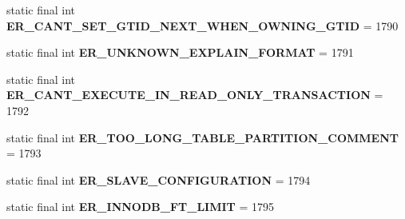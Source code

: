 \begin{DoxyCompactItemize}
\item 
\mbox{\label{classcom_1_1mysql_1_1cj_1_1exceptions_1_1_mysql_error_numbers_a1f4382313a77aeb1f93c33a0263d82d9}} 
static final int {\bfseries E\+R\+\_\+\+C\+A\+N\+T\+\_\+\+S\+E\+T\+\_\+\+G\+T\+I\+D\+\_\+\+N\+E\+X\+T\+\_\+\+W\+H\+E\+N\+\_\+\+O\+W\+N\+I\+N\+G\+\_\+\+G\+T\+ID} = 1790
\item 
\mbox{\label{classcom_1_1mysql_1_1cj_1_1exceptions_1_1_mysql_error_numbers_a3857fb3c5caef2816ae9dd981fdcfc5d}} 
static final int {\bfseries E\+R\+\_\+\+U\+N\+K\+N\+O\+W\+N\+\_\+\+E\+X\+P\+L\+A\+I\+N\+\_\+\+F\+O\+R\+M\+AT} = 1791
\item 
\mbox{\label{classcom_1_1mysql_1_1cj_1_1exceptions_1_1_mysql_error_numbers_a7352ac094fadef4d6b5efcca4a6b800a}} 
static final int {\bfseries E\+R\+\_\+\+C\+A\+N\+T\+\_\+\+E\+X\+E\+C\+U\+T\+E\+\_\+\+I\+N\+\_\+\+R\+E\+A\+D\+\_\+\+O\+N\+L\+Y\+\_\+\+T\+R\+A\+N\+S\+A\+C\+T\+I\+ON} = 1792
\item 
\mbox{\label{classcom_1_1mysql_1_1cj_1_1exceptions_1_1_mysql_error_numbers_a911ac0549012e10b833e84cd248d3331}} 
static final int {\bfseries E\+R\+\_\+\+T\+O\+O\+\_\+\+L\+O\+N\+G\+\_\+\+T\+A\+B\+L\+E\+\_\+\+P\+A\+R\+T\+I\+T\+I\+O\+N\+\_\+\+C\+O\+M\+M\+E\+NT} = 1793
\item 
\mbox{\label{classcom_1_1mysql_1_1cj_1_1exceptions_1_1_mysql_error_numbers_ab6ef15daa7fad3209f2726c941256160}} 
static final int {\bfseries E\+R\+\_\+\+S\+L\+A\+V\+E\+\_\+\+C\+O\+N\+F\+I\+G\+U\+R\+A\+T\+I\+ON} = 1794
\item 
\mbox{\label{classcom_1_1mysql_1_1cj_1_1exceptions_1_1_mysql_error_numbers_a22f75871847e192ede2b60cbe1699151}} 
static final int {\bfseries E\+R\+\_\+\+I\+N\+N\+O\+D\+B\+\_\+\+F\+T\+\_\+\+L\+I\+M\+IT} = 1795
\item 
\mbox{\label{classcom_1_1mysql_1_1cj_1_1exceptions_1_1_mysql_error_numbers_a48cdcb98b0b8de2d83eebb818f2ca83d}} 

\end{DoxyCompactItemize}
